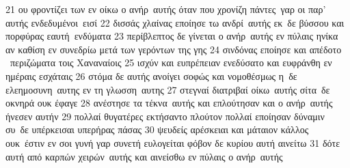 \documentclass[10pt,oneside,footinclude=true,headinclude=true]{scrbook} %
\begin{document}
21 ου φροντίζει των εν οίκω ο ανήρ αυτής όταν που χρονίζη πάντες γαρ οι παρ' αυτής ενδεδυμένοι εισί
22 δισσάς χλαίνας εποίησε τω ανδρί αυτής εκ δε βύσσου και πορφύρας εαυτή ενδύματα
23 περίβλεπτος δε γίνεται ο ανήρ αυτής εν πύλαις ηνίκα αν καθίση εν συνεδρίω μετά των γερόντων της γης
24 σινδόνας εποίησε και απέδοτο  περιζώματα τοις Χαναναίοις
25 ισχύν και ευπρέπειαν ενεδύσατο και ευφράνθη εν ημέραις εσχάταις
26 στόμα δε αυτής ανοίγει σοφώς και νομοθέσμως η δε ελεημοσυνη αυτης εν τη γλωσση αυτης
27 στεγναί διατριβαί οίκω αυτής σίτα δε οκνηρά ουκ έφαγε
28 ανέστησε τα τέκνα αυτής και επλούτησαν και ο ανήρ αυτής ήνεσεν αυτήν
29 πολλαί θυγατέρες εκτήσαντο πλούτον πολλαί εποίησαν δύναμιν συ δε υπέρκεισαι υπερήρας πάσας
30 ψευδείς αρέσκειαι και μάταιον κάλλος ουκ έστιν εν σοι γυνή γαρ συνετή ευλογείται φόβον δε κυρίου αυτή αινείτω
31 δότε αυτή από καρπών χειρών αυτής και αινείσθω εν πύλαις ο ανήρ αυτής
\end{document}
